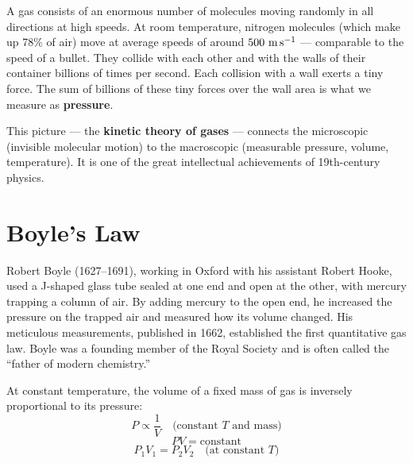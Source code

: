 A gas consists of an enormous number of molecules
moving randomly in all directions at high speeds.
At room temperature, nitrogen molecules (which make
up 78\% of air) move at average speeds of around
$500\ \text{m\,s}^{-1}$ --- comparable to the speed of a bullet.
They collide with each other and with the walls of
their container billions of times per second. Each
collision with a wall exerts a tiny force. The sum
of billions of these tiny forces over the wall area
is what we measure as \textbf{pressure}.

This picture --- the \textbf{kinetic theory of gases}
--- connects the microscopic (invisible molecular
motion) to the macroscopic (measurable pressure,
volume, temperature). It is one of the great
intellectual achievements of 19th-century physics.

\section{Boyle's Law}

\begin{historybox}
Robert Boyle (1627--1691), working in Oxford with
his assistant Robert Hooke, used a J-shaped glass
tube sealed at one end and open at the other, with
mercury trapping a column of air. By adding mercury
to the open end, he increased the pressure on the
trapped air and measured how its volume changed.
His meticulous measurements, published in 1662,
established the first quantitative gas law. Boyle
was a founding member of the Royal Society and is
often called the ``father of modern chemistry.''
\end{historybox}

\begin{lawbox}
At constant temperature, the volume of a fixed mass
of gas is inversely proportional to its pressure:
\[
  P \propto \frac{1}{V}
  \quad \text{(constant } T \text{ and mass)}
\]
\[
  PV = \text{constant}
\]
\[
  \boxed{P_1 V_1 = P_2 V_2}
  \quad \text{(at constant } T\text{)}
\]
\end{lawbox}

